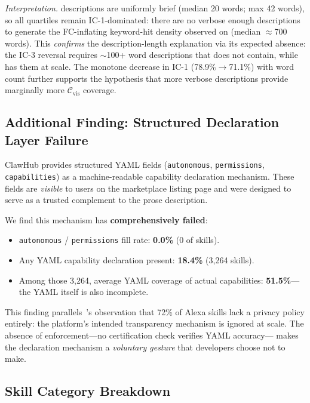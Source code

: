 \noindent\textit{Interpretation.}
\clawhub{} descriptions are uniformly brief (median 20 words; max 42 words),
so all quartiles remain IC-1-dominated: there are no verbose enough descriptions
to generate the FC-inflating keyword-hit density observed on \skillssh{}
(median $\approx$700 words).
This \emph{confirms} the description-length explanation via its expected
absence: the IC-3 reversal requires $\sim$100+ word descriptions
that \clawhub{} does not contain, while \skillssh{} has them at scale.
The monotone decrease in IC-1 (78.9\%$\to$71.1\%) with word count
further supports the hypothesis that more verbose descriptions provide
marginally more $\mathcal{C}_{\text{vis}}$ coverage.

\subsection{Additional Finding: Structured Declaration Layer Failure}

ClawHub provides structured YAML fields
(\texttt{autonomous}, \texttt{permissions}, \texttt{capabilities})
as a machine-readable capability declaration mechanism.
These fields are \emph{visible} to users on the marketplace listing page
and were designed to serve as a trusted complement to the prose description.

We find this mechanism has \textbf{comprehensively failed}:
\begin{itemize}[topsep=2pt,itemsep=1pt]
\item \texttt{autonomous} / \texttt{permissions} fill rate: \textbf{0.0\%}
  (0 of \NskillsDMR{} skills).
\item Any YAML capability declaration present: \textbf{18.4\%} (3,264 skills).
\item Among those 3,264, average YAML coverage of actual capabilities:
  \textbf{51.5\%}---the YAML itself is also incomplete.
\end{itemize}

This finding parallels~\cite{liao2020measuring}'s observation that
72\% of Alexa skills lack a privacy policy entirely:
the platform's intended transparency mechanism is ignored at scale.
The absence of enforcement---no certification check verifies YAML accuracy---
makes the declaration mechanism a \emph{voluntary gesture} that developers
choose not to make.

\subsection{Skill Category Breakdown}
\label{sec:category}

